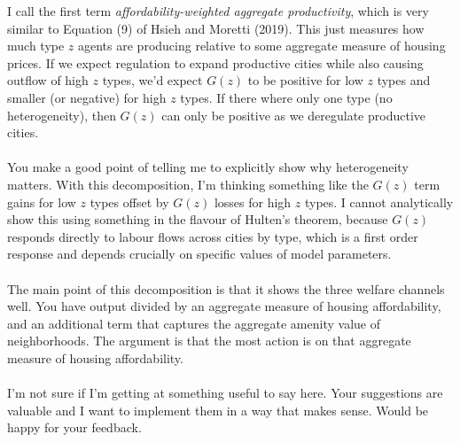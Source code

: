 \documentclass[11pt]{article}
\begin{document}
I call the first term \textit{affordability-weighted aggregate productivity}, which is very similar to Equation (9) of Hsieh and Moretti (2019). This just measures how much type $z$ agents are producing relative to some aggregate measure of housing prices. If we expect regulation to expand productive cities while also causing outflow of high $z$ types, we'd expect $G(z)$ to be positive for low $z$ types and smaller (or negative) for high $z$ types.  If there where only one type (no heterogeneity), then $G(z)$ can only be positive as we deregulate productive cities. 

\paragraph*{}
You make a good point of telling me to explicitly show why heterogeneity matters. With this decomposition, I'm thinking something like the $G(z)$ term gains for low $z$ types offset by $G(z)$ losses for high $z$ types. I cannot analytically show this using something in the flavour of Hulten's theorem, because $G(z)$ responds directly to labour flows across cities by type, which is a first order response and depends crucially on specific values of model parameters. 

\paragraph*{}
The main point of this decomposition is that it shows the three welfare channels well. You have output divided by an aggregate measure of housing affordability, and an additional term that captures the aggregate amenity value of neighborhoods. The argument is that the most action is on that aggregate measure of housing affordability. 


\paragraph*{}I'm not sure if I'm getting at something useful to say here. Your suggestions are valuable and I want to implement them in a way that makes sense. Would be happy for your feedback. 

\end{document}
